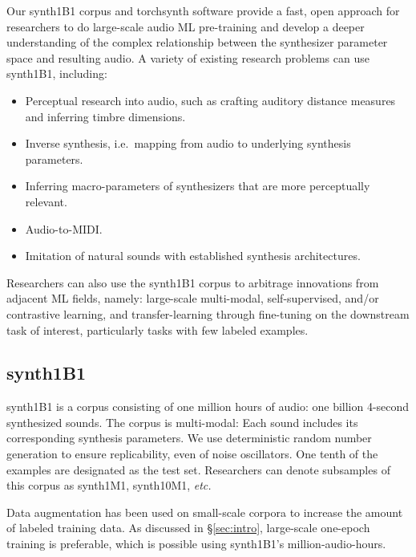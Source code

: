 Our synth1B1 corpus and torchsynth software provide a fast, open approach for researchers to do large-scale audio ML pre-training and develop a deeper understanding of the complex relationship between the synthesizer parameter space and resulting audio.
A variety of existing research problems can use synth1B1, including:
\begin{itemize}
\item Perceptual research into audio, such as crafting auditory distance measures and inferring timbre dimensions. \cite{vahidi2020timbre}
\item Inverse synthesis, i.e.\ mapping from audio to underlying synthesis parameters.
\cite{yee2018automatic,esling2020flow}
\item Inferring macro-parameters of synthesizers that are more perceptually relevant. \cite{esling2020flow, tatar2020latent}
\item Audio-to-MIDI. \cite{47659}
\item Imitation of natural sounds with established synthesis architectures.
\end{itemize}
Researchers can also use the synth1B1 corpus to arbitrage innovations from adjacent ML fields, namely: large-scale multi-modal, self-supervised, and/or contrastive learning, and transfer-learning through fine-tuning on the downstream task of interest, particularly tasks with few labeled examples.

\subsection{synth1B1}

synth1B1 is a corpus consisting of one million hours of audio: one billion 4-second synthesized sounds. The corpus is multi-modal: Each sound includes its corresponding synthesis parameters. We use deterministic random number generation to ensure replicability, even of noise oscillators. One tenth of the examples are designated as the test set. Researchers can denote subsamples of this corpus as synth1M1, synth10M1, {\em etc.} %

Data augmentation has been used on small-scale corpora to increase the amount of labeled training data. As discussed in \S\ref{sec:intro}, large-scale one-epoch training is preferable, which is possible using synth1B1's million-audio-hours.

